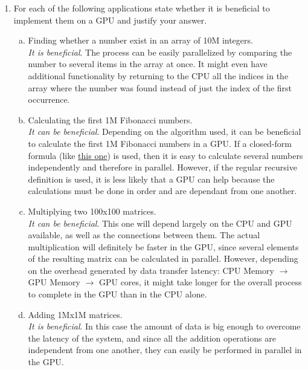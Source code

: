 \documentclass{article}
\begin{document}
\begin{enumerate}[1.]
    \item For each of the following applications state whether it is beneficial to implement them on a GPU and justify your answer.
    \begin{enumerate}[a)]
        \item Finding whether a number exist in an array of 10M integers.\\
        \emph{It is beneficial}. The process can be easily parallelized by comparing the number to several items in the array at once. It might even have additional functionality by returning to the CPU all the indices in the array where the number was found instead of just the index of the first occurrence. 
        \item Calculating the first 1M Fibonacci numbers.\\
        \emph{It can be beneficial}. Depending on the algorithm used, it can be beneficial to calculate the first 1M Fibonacci numbers in a GPU. If a closed-form formula (like \href{https://en.wikipedia.org/wiki/Fibonacci_number#Closed-form_expression}{this one}) is used, then it is easy to calculate several numbers independently and therefore in parallel. However, if the regular recursive definition is used, it is less likely that a GPU can help because the calculations must be done in order and are dependant from one another. 
        \item Multiplying two 100x100 matrices.\\
        \emph{It can be beneficial}. This one will depend largely on the CPU and GPU available, as well as the connections between them. The actual multiplication will definitely be faster in the GPU, since several elements of the resulting matrix can be calculated in parallel. However, depending on the overhead generated by data transfer latency: CPU Memory $\rightarrow$ GPU Memory $\rightarrow$ GPU cores, it might take longer for the overall process to complete in the GPU than in the CPU alone.
        \item Adding 1Mx1M matrices.\\
        \emph{It is beneficial}. In this case the amount of data is big enough to overcome the latency of the system, and since all the addition operations are independent from one another, they can easily be performed in parallel in the GPU.
    \end{enumerate}
	    

\end{enumerate}
\end{document}
